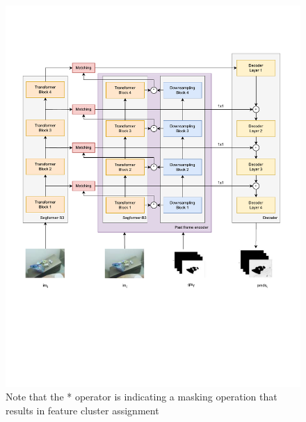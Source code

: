 \begin{figure}
    \centering
    \includegraphics[width=1.\linewidth, trim={ 0.5cm 4cm 1cm 1.5cm}]{figures/03_method/model_detailed_overview.pdf}
    \caption{Detailed model overview of the proposed mask encoder
    }
    \caption*{Note that the * operator is indicating a masking operation that results in feature cluster assignment}
    \label{fig:detailed_model}
\end{figure}

